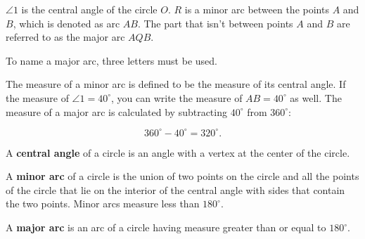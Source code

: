 $\angle 1$ is the central angle of the circle $O$. $R$ is a minor arc between
the points $A$ and $B$, which is denoted as arc $AB$. The part that isn't
between points $A$ and $B$ are referred to as the major arc $AQB$.

\begin{note}
  To name a major arc, three letters must be used.
\end{note}

The measure of a minor arc is defined to be the measure of its central angle.
If the measure of $\angle 1 = 40^{\circ}$, you can write the measure of $AB =
40^{\circ}$ as well. The measure of a major arc is calculated by subtracting
$40^{\circ}$ from $360^{\circ}$:

\[ 360^{\circ} - 40^{\circ} = 320^{\circ} . \]

\begin{definition}
  \label{def:central_angle}

  A \textbf{central angle} of a circle is an angle with a vertex at the center
  of the circle.
\end{definition}

\begin{definition}
  \label{def:minor_arcj}

  A \textbf{minor arc} of a circle is the union of two points on the circle and
  all the points of the circle that lie on the interior of the central angle
  with sides that contain the two points. Minor arcs measure less than
  $180^{\circ}$.
\end{definition}

\begin{definition}
  \label{def:major_arc}

  A \textbf{major arc} is an arc of a circle having measure greater than or
  equal to $180^{\circ}$.
\end{definition}

